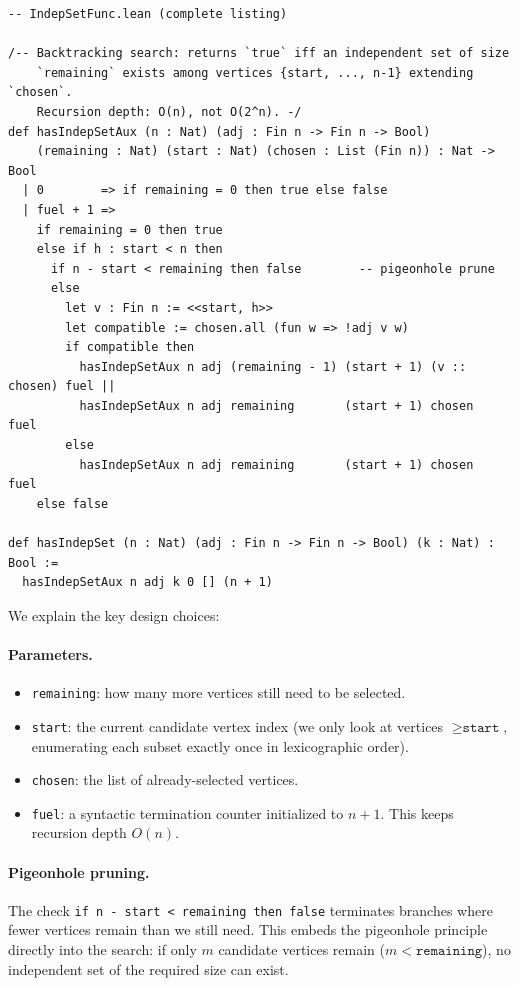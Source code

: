 \documentclass[11pt]{article}
\newcommand{\lean}[1]{\texttt{#1}}
\begin{document}
\begin{lstlisting}
-- IndepSetFunc.lean (complete listing)

/-- Backtracking search: returns `true` iff an independent set of size
    `remaining` exists among vertices {start, ..., n-1} extending `chosen`.
    Recursion depth: O(n), not O(2^n). -/
def hasIndepSetAux (n : Nat) (adj : Fin n -> Fin n -> Bool)
    (remaining : Nat) (start : Nat) (chosen : List (Fin n)) : Nat -> Bool
  | 0        => if remaining = 0 then true else false
  | fuel + 1 =>
    if remaining = 0 then true
    else if h : start < n then
      if n - start < remaining then false        -- pigeonhole prune
      else
        let v : Fin n := <<start, h>>
        let compatible := chosen.all (fun w => !adj v w)
        if compatible then
          hasIndepSetAux n adj (remaining - 1) (start + 1) (v :: chosen) fuel ||
          hasIndepSetAux n adj remaining       (start + 1) chosen         fuel
        else
          hasIndepSetAux n adj remaining       (start + 1) chosen         fuel
    else false

def hasIndepSet (n : Nat) (adj : Fin n -> Fin n -> Bool) (k : Nat) : Bool :=
  hasIndepSetAux n adj k 0 [] (n + 1)
\end{lstlisting}

\noindent
We explain the key design choices:

\paragraph{Parameters.}
\begin{itemize}
  \item \lean{remaining}: how many more vertices still need to be selected.
  \item \lean{start}: the current candidate vertex index (we only look
        at vertices $\geq \lean{start}$, enumerating each subset exactly
        once in lexicographic order).
  \item \lean{chosen}: the list of already-selected vertices.
  \item \lean{fuel}: a syntactic termination counter initialized to $n+1$.
        This keeps recursion depth $O(n)$.
\end{itemize}

\paragraph{Pigeonhole pruning.}
The check \lean{if n - start < remaining then false} terminates branches
where fewer vertices remain than we still need.
This embeds the pigeonhole principle directly into the search: if only $m$
candidate vertices remain ($m < \lean{remaining}$), no independent set of
the required size can exist.
\end{document}
